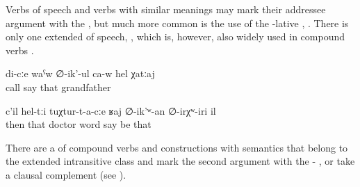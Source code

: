 Verbs of speech and verbs with similar meanings may mark their addressee argument with the  , but much more common is the use of the -lative , . There is only one extended  of speech,  , which is, however, also widely used in compound verbs .

\begin{exe}
	\ex	\label{ex:verbs of speech}
	\begin{xlist}
		\ex	{} 
		\ex	{} 
		\ex	{} 
		\ex	{} 
		\ex	{} 
		\ex	{} 
	\end{xlist}

	\ex	\label{ex:The grandfather is calling me@27a}
	\gll	di-cːe	waˁw	∅-ik'-ul	ca-w	hel	χatːaj\\
			call	say		that	grandfather\\
	\glt	{}

	\ex	\label{ex:He was the one who was talking to the doctors}
	\gll	c'il	hel-tːi	tuχtur-t-a-cːe	ʁaj	∅-ik'ʷ-an	∅-irχʷ-iri	il\\
		then	that	doctor	word	\tsc{m-}say be	that\\
	\glt	{} 
\end{exe}

There are a  of compound verbs and  constructions with  semantics that belong to the extended intransitive class and mark the second argument with the - ,  or take a clausal complement  (see ).


